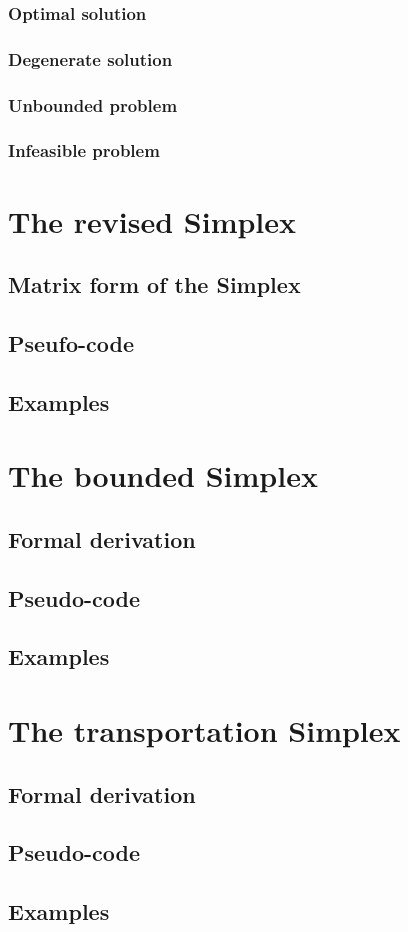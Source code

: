 \subsubsection{Optimal solution}
\subsubsection{Degenerate solution}
\subsubsection{Unbounded problem}
\subsubsection{Infeasible problem}

\section{The revised Simplex}
\subsection{Matrix form of the Simplex}
\subsection{Pseufo-code}
\subsection{Examples}

\section{The bounded Simplex}
\subsection{Formal derivation}
\subsection{Pseudo-code}
\subsection{Examples}

\section{The transportation Simplex}
\subsection{Formal derivation}
\subsection{Pseudo-code}
\subsection{Examples}
